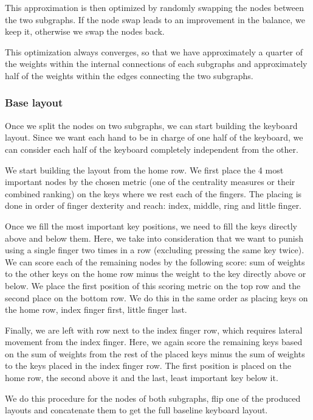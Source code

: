 \documentclass[9pt,twocolumn,twoside]{pnas-report}
\begin{document}
{This approximation is then optimized by randomly swapping the nodes between the two subgraphs.
If the node swap leads to an improvement in the balance, we keep it, otherwise we swap the nodes back.

This optimization always converges, so that we have approximately a quarter of the weights within the internal connections of each subgraphs and approximately half of the weights within the edges connecting the two subgraphs.

\subsubsection*{Base layout}

Once we split the nodes on two subgraphs, we can start building the keyboard layout.
Since we want each hand to be in charge of one half of the keyboard, we can consider each half of the keyboard completely independent from the other.

We start building the layout from the home row.
We first place the 4 most important nodes by the chosen metric (one of the centrality measures or their combined ranking) on the keys where we rest each of the fingers.
The placing is done in order of finger dexterity and reach: index, middle, ring and little finger.

Once we fill the most important key positions, we need to fill the keys directly above and below them.
Here, we take into consideration that we want to punish using a single finger two times in a row (excluding pressing the same key twice).
We can score each of the remaining nodes by the following score: sum of weights to the other keys on the home row minus the weight to the key directly above or below.
We place the first position of this scoring metric on the top row and the second place on the bottom row.
We do this in the same order as placing keys on the home row, index finger first, little finger last.

Finally, we are left with row next to the index finger row, which requires lateral movement from the index finger.
Here, we again score the remaining keys based on the sum of weights from the rest of the placed keys minus the sum of weights to the keys placed in the index finger row.
The first position is placed on the home row, the second above it and the last, least important key below it.

We do this procedure for the nodes of both subgraphs, flip one of the produced layouts and concatenate them to get the full baseline keyboard layout.

}
\end{document}
